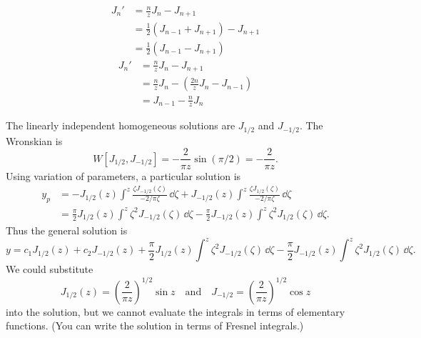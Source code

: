 {%
\begin{Solution}
  \begin{align*}
    J_n'    
    &= \frac{n}{z} J_n - J_{n+1} 
    \\
    &= \frac{1}{2}(J_{n-1} + J_{n+1}) - J_{n+1} 
    \\
    &= \frac{1}{2}(J_{n-1} - J_{n+1}) 
  \end{align*}
  \begin{align*}
    J_n'    
    &= \frac{n}{z} J_n - J_{n+1} 
    \\
    &= \frac{n}{z} J_n - \left(\frac{2 n}{z} J_n - J_{n-1}\right) 
    \\
    &= J_{n-1} - \frac{n}{z} J_n
  \end{align*}
\end{Solution}







\begin{Solution}
  The linearly independent homogeneous solutions are $J_{1/2}$ and $J_{-1/2}$.
  The Wronskian is
  \[ 
  W[J_{1/2}, J_{-1/2}] = -\frac{2}{\pi z} \sin(\pi/2) = -\frac{2}{\pi z}.
  \]
  Using variation of parameters, a particular solution is
  \begin{align*}
    y_p     
    &= - J_{1/2}(z) \int^z \frac{\zeta J_{-1/2}(\zeta)}{-2/\pi \zeta}\,\dd \zeta + 
    J_{-1/2}(z) \int^z \frac{\zeta J_{1/2}(\zeta)}{-2/\pi \zeta}\,\dd \zeta  
    \\
    &= \frac{\pi}{2} J_{1/2}(z) \int^z \zeta^2 J_{-1/2}(\zeta)\,\dd \zeta -
    \frac{\pi}{2} J_{-1/2}(z) \int^z \zeta^2 J_{1/2}(\zeta)\,\dd \zeta.
  \end{align*}
  Thus the general solution is
  \[ 
  \boxed{ 
    y = c_1 J_{1/2}(z) + c_2 J_{-1/2}(z) + 
    \frac{\pi}{2} J_{1/2}(z) \int^z \zeta^2 J_{-1/2}(\zeta)\,\dd \zeta -
    \frac{\pi}{2} J_{-1/2}(z) \int^z \zeta^2 J_{1/2}(\zeta)\,\dd \zeta.
    } 
  \]
  We could substitute 
  \[ 
  J_{1/2}(z) = \left(\frac{2}{\pi z} \right)^{1/2} \sin z \quad
  \mathrm{and} \quad
  J_{-1/2} = \left(\frac{2}{\pi z} \right)^{1/2} \cos z 
  \]
  into the solution, but we cannot evaluate the integrals in terms of
  elementary functions. (You can write the solution in terms of
  Fresnel integrals.)
\end{Solution}






}
